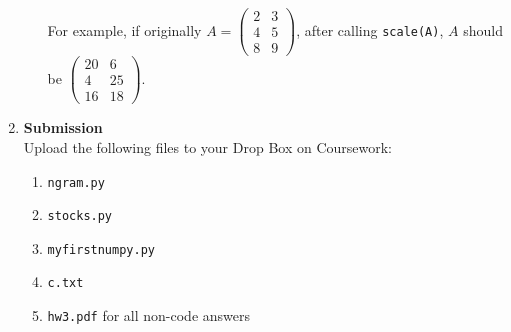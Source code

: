 \documentclass{article}
\newcounter{points}
\newcounter{bonuspoints}
\newcommand\setbonuspoints[1]{\addtocounter{bonuspoints}{#1}(#1 bonus points)}
\newcommand\printpoints{Total number of points: \value{\thepoints}}
\begin{document}
\begin{enumerate}
\begin{enumerate}
For example, if originally $A = \begin{pmatrix} 2 & 3 \\ 4 & 5 \\ 8 & 9 \end{pmatrix}$, after calling \texttt{scale(A)}, $A$ should be $\begin{pmatrix} 20 & 6 \\ 4 & 25 \\ 16 & 18 \end{pmatrix}$.

\end{enumerate}


\item \textbf{Submission} \\
Upload the following files to your Drop Box on Coursework:
\begin{enumerate}
\item \texttt{ngram.py}
\item \texttt{stocks.py}
\item \texttt{myfirstnumpy.py}
\item \texttt{c.txt}
\item \texttt{hw3.pdf} for all non-code answers
\end{enumerate}

\end{enumerate}
\end{document}
